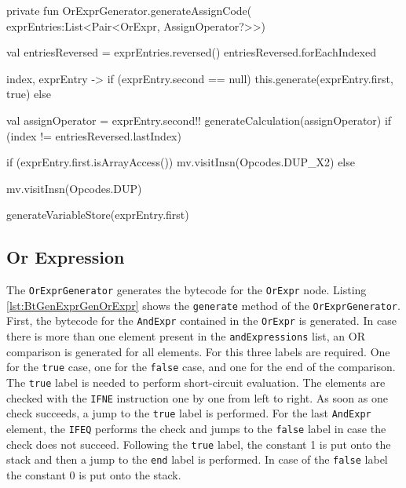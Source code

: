 \begin{KotlinCode}[float,numbers=none,caption=Implementation of the \texttt{generateAssignCode} extension function in the \texttt{ExpressionGenerator}., label=lst:BtGenExprGenValStackStore]
private fun OrExprGenerator.generateAssignCode(
    exprEntries:List<Pair<OrExpr, AssignOperator?>>) {
    val entriesReversed = exprEntries.reversed()
    entriesReversed.forEachIndexed { index, exprEntry ->
        if (exprEntry.second == null) {
            this.generate(exprEntry.first, true)
        } else {
            val assignOperator = exprEntry.second!!
            generateCalculation(assignOperator)
            if (index != entriesReversed.lastIndex) {
                if (exprEntry.first.isArrayAccess()) {
                    mv.visitInsn(Opcodes.DUP_X2)
                } else {
                    mv.visitInsn(Opcodes.DUP)

                }
            }
            generateVariableStore(exprEntry.first)
        }
    }
}
\end{KotlinCode}

\subsection{Or Expression}

The \verb|OrExprGenerator| generates the bytecode for the \verb|OrExpr| node. Listing \ref{lst:BtGenExprGenOrExpr} shows the \verb|generate| method of the \verb|OrExprGenerator|. First, the bytecode for the \verb|AndExpr| contained in the \verb|OrExpr| is generated. In case there is more than one element present in the \verb|andExpressions| list, an OR comparison is generated for all elements. For this three labels are required. One for the \verb|true| case, one for the \verb|false| case, and one for the end of the comparison. The \verb|true| label is needed to perform short-circuit evaluation. The elements are checked with the \verb|IFNE| instruction one by one from left to right. As soon as one check succeeds, a jump to the \verb|true| label is performed. For the last \verb|AndExpr| element, the \verb|IFEQ| performs the check and jumps to the \verb|false| label in case the check does not succeed. Following the \verb|true| label, the constant 1 is put onto the stack and then a jump to the \verb|end| label is performed. In case of the \verb|false| label the constant 0 is put onto the stack. 


